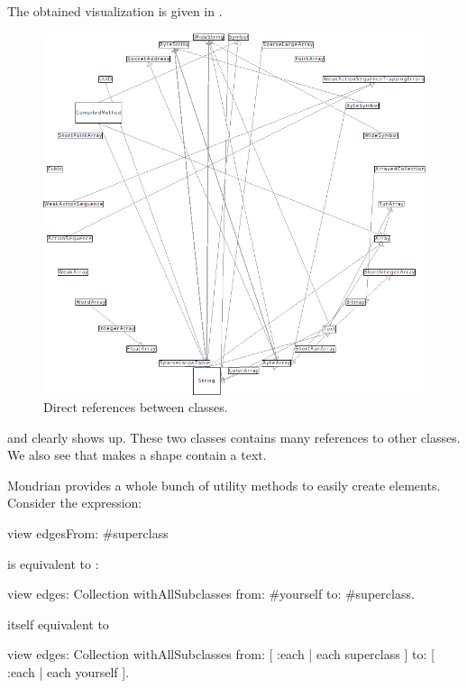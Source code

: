 \documentclass[a4paper,10pt,twoside]{book}
\begin{document}
The obtained visualization is given in .

\begin{figure}[htbp]
\centerline{\includegraphics[width=\linewidth]{classDependencies}}
\caption{Direct references between classes.}
\label{fig:classDependencies}
\end{figure}

 and  clearly shows up. These two classes contains many references to other classes.
We also see that  makes a shape contain a text.

Mondrian provides a whole bunch of utility methods to easily create elements.  Consider the expression:
\begin{code}{}
view edgesFrom: #superclass
\end{code}

 is equivalent to  :

\begin{code}{}
view edges: Collection withAllSubclasses from: #yourself to: #superclass.
\end{code}
itself equivalent to
\begin{code}{}
view 
  edges: Collection withAllSubclasses 
  from: [ :each | each superclass ] 
  to: [ :each | each yourself ].
\end{code}
\end{document}
